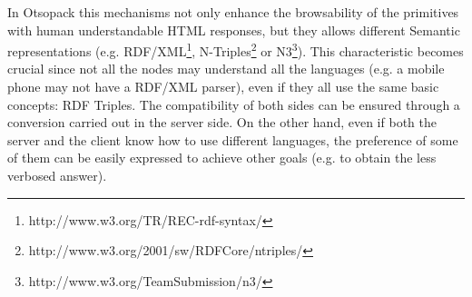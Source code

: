 In Otsopack this mechanisms not only enhance the browsability of the primitives with human understandable HTML responses, but they allows different Semantic representations (e.g. RDF/XML\footnote{http://www.w3.org/TR/REC-rdf-syntax/}, N-Triples\footnote{http://www.w3.org/2001/sw/RDFCore/ntriples/} or N3\footnote{http://www.w3.org/TeamSubmission/n3/}).
This characteristic becomes crucial since not all the nodes may understand all the languages (e.g. a mobile phone may not have a RDF/XML parser), even if they all use the same basic concepts: RDF Triples.
The compatibility of both sides can be ensured through a conversion carried out in the server side.
On the other hand, even if both the server and the client know how to use different languages, the preference of some of them can be easily expressed to achieve other goals (e.g. to obtain the less verbosed answer).
